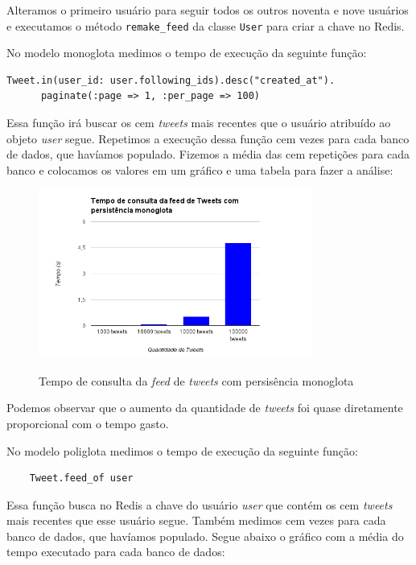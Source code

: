 Alteramos o primeiro usuário para seguir todos os outros noventa e nove usuários e executamos o método \verb|remake_feed| da classe \verb|User| para criar a chave no \ac{Redis}.

No modelo monoglota medimos o tempo de execução da seguinte função:
\begin{lstlisting}
Tweet.in(user_id: user.following_ids).desc("created_at").
      paginate(:page => 1, :per_page => 100)
\end{lstlisting}

Essa função irá buscar os cem \textit{tweets} mais recentes que o usuário atribuído ao objeto \textit{user} segue. Repetimos a execução dessa função cem vezes para cada banco de dados, que havíamos populado. Fizemos a média das cem repetições para cada banco e colocamos os valores em um gráfico e uma tabela para fazer a análise:

\begin{figure}[H]
    \centering
    \caption{Tempo de consulta da \textit{feed} de \textit{tweets} com persisência monoglota}
    \includegraphics[width=0.8\textwidth]{./04-figuras/time_feed_mono.png}
    \label{fig:time_feed_mono}
\end{figure}




Podemos observar que o aumento da quantidade de \textit{tweets} foi quase diretamente proporcional com o tempo gasto.


No modelo poliglota medimos o tempo de execução da seguinte função: 
\begin{lstlisting}
	Tweet.feed_of user
\end{lstlisting} 

Essa função busca no \ac{Redis} a chave do usuário \textit{user} que contém os cem \textit{tweets} mais recentes que esse usuário segue. Também medimos cem vezes para cada banco de dados, que havíamos populado. Segue abaixo o gráfico com a média do tempo executado para cada banco de dados:


